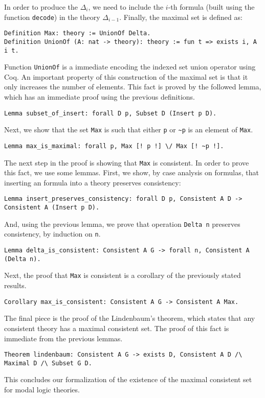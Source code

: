 \documentclass[3p,times]{elsarticle}
\begin{document}
In order to produce the $\Delta_{i}$, we need to include the $i$-th formula (built using the function \texttt{decode})
in the theory $\Delta_{i - 1}$. Finally, the maximal set is defined as:
\begin{verbatim}
Definition Max: theory := UnionOf Delta.
Definition UnionOf (A: nat -> theory): theory := fun t => exists i, A i t.
\end{verbatim}
Function \texttt{UnionOf} is a immediate encoding the indexed set union operator using Coq. An important property
of this construction of the maximal set is that it only increases the number of elements. This fact is proved by
the followed lemma, which has an immediate proof using the previous definitions.
\begin{verbatim}
Lemma subset_of_insert: forall D p, Subset D (Insert p D).
\end{verbatim}
Next, we show that the set \texttt{Max} is such that either \verb|p| or \verb|~p| is an element of \verb|Max|.
\begin{verbatim}
Lemma max_is_maximal: forall p, Max [! p !] \/ Max [! ~p !].
\end{verbatim}
The next step in the proof is showing that \texttt{Max} is consistent. In order to prove this fact,
we use some lemmas. First, we show, by case analysis on formulas, that inserting an formula into a theory
preserves consistency:
\begin{verbatim}
Lemma insert_preserves_consistency: forall D p, Consistent A D -> Consistent A (Insert p D).
\end{verbatim}
And, using the previous lemma, we prove that operation \texttt{Delta n} preserves consistency, by induction on \verb|n|.
\begin{verbatim}
Lemma delta_is_consistent: Consistent A G -> forall n, Consistent A (Delta n).
\end{verbatim}
Next, the proof that \texttt{Max} is consistent is a corollary of the previously stated results.
\begin{verbatim}
Corollary max_is_consistent: Consistent A G -> Consistent A Max.
\end{verbatim}
The final piece is the proof of the Lindenbaum's theorem, which states that any consistent theory has
a maximal consistent set. The proof of this fact is immediate from the previous lemmas.
\begin{verbatim}
Theorem lindenbaum: Consistent A G -> exists D, Consistent A D /\ Maximal D /\ Subset G D.
\end{verbatim}
This concludes our formalization of the existence of the maximal consistent set for modal logic theories.
\end{document}
